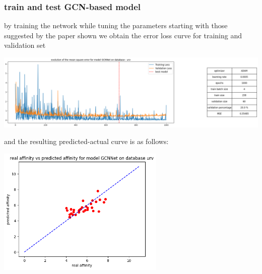 \documentclass[11pt, a4paper]{article}
\begin{document}
        \subsubsection{train and test GCN-based model}
        by training the network while tuning the parameters starting with those suggested by the paper shown we obtain the error loss curve for training and validation set 
        \begin{center}
            \includegraphics[width=1.0\textwidth]{train_test_plots/URV GCN train.png}
        \end{center}
        and the resulting predicted-actual curve is as follows:
        \begin{center}
            \includegraphics[width=0.6\textwidth]{train_test_plots/URV GCN test.png}
        \end{center}
\end{document}
